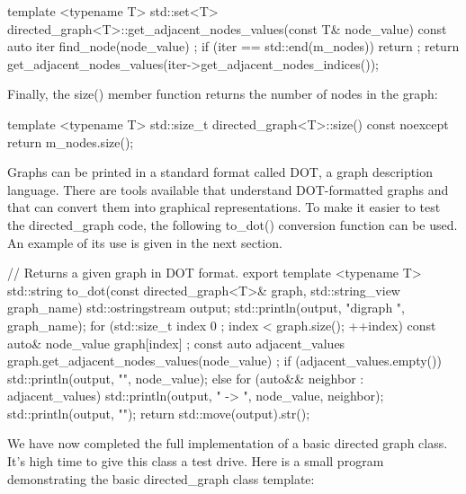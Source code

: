 \begin{cpp}
template <typename T>
std::set<T> directed_graph<T>::get_adjacent_nodes_values(const T& node_value) const
{
    auto iter { find_node(node_value) };
    if (iter == std::end(m_nodes)) { return {}; }
    return get_adjacent_nodes_values(iter->get_adjacent_nodes_indices());
}
\end{cpp}


Finally, the size() member function returns the number of nodes in the graph:

\begin{cpp}
template <typename T>
std::size_t directed_graph<T>::size() const noexcept
{
    return m_nodes.size();
}
\end{cpp}


Graphs can be printed in a standard format called DOT, a graph description language. There are tools available that understand DOT-formatted graphs and that can convert them into graphical representations. To make it easier to test the directed\_graph code, the following to\_dot() conversion function can be used. An example of its use is given in the next section.

\begin{cpp}
// Returns a given graph in DOT format.
export template <typename T>
std::string to_dot(const directed_graph<T>& graph, std::string_view graph_name)
{
    std::ostringstream output;
    std::println(output, "digraph {} {{", graph_name);
            for (std::size_t index { 0 }; index < graph.size(); ++index) {
                const auto& node_value { graph[index] };
                const auto adjacent_values { graph.get_adjacent_nodes_values(node_value) };
                if (adjacent_values.empty()) {
                    std::println(output, "{}", node_value);
                } else {
                    for (auto&& neighbor : adjacent_values) {
                        std::println(output, "{} -> {}", node_value, neighbor);
                    }
                }
            }
            std::println(output, "}}");
    return std::move(output).str();
}
\end{cpp}


We have now completed the full implementation of a basic directed graph class. It’s high time to give this class a test drive. Here is a small program demonstrating the basic directed\_graph class template:

